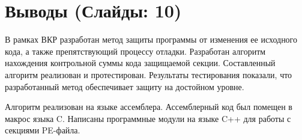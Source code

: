 
\section{Выводы (Слайды: 10)}

В рамках ВКР разработан метод защиты программы от изменения ее исходного кода, а
также препятствующий процессу отладки. Разработан алгоритм нахождения
контрольной суммы кода защищаемой секции. Составленный алгоритм реализован и
протестирован. Результаты тестирования показали, что разработанный метод
обеспечивает защиту на достойном уровне.

Алгоритм реализован на языке ассемблера. Ассемблерный код был помещен в макрос
языка C. Написаны программные модули на языке C++ для работы с секциями
PE-файла.


